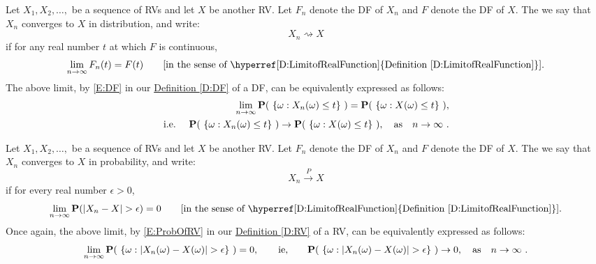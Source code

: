 \begin{definition}\label{D:ConvInDist}
Let $X_1,X_2,\ldots,$ be a sequence of RVs and let $X$ be another RV.  Let $F_n$ denote the DF of $X_n$ and $F$ denote the DF of $X$.  The we say that $X_n$ converges to $X$ in distribution, and write:
\[
X_n \rightsquigarrow X
\]
if for any real number $t$ at which $F$ is continuous,
\[
\lim_{n \rightarrow \infty} F_n(t) = F(t) \qquad \text{[in the sense of \hyperref[D:LimitofRealFunction]{Definition \ref*{D:LimitofRealFunction}}].}
\]
The above limit, by \eqref{E:DF} in our \hyperref[D:DF]{Definition \ref*{D:DF}} of a DF, can be equivalently expressed as follows: 
\begin{eqnarray}
& & \lim_{n \rightarrow \infty} \mathbf{P}( \ \{\omega: X_n(\omega) \leq  t \} \ )= 
\mathbf{P}( \ \{\omega: X(\omega) \leq  t \} \ ), \notag \\
&\text{i.e.~} & \mathbf{P}( \ \{\omega: X_n(\omega) \leq t \} \ ) \rightarrow \mathbf{P}( \ \{\omega: X(\omega) \leq  t \} \ ), \quad \text{as} \quad n \rightarrow \infty \notag \ .
\end{eqnarray}
\end{definition}

\begin{definition}\label{D:ConvInProb}
Let $X_1,X_2,\ldots,$ be a sequence of RVs and let $X$ be another RV.  Let $F_n$ denote the DF of $X_n$ and $F$ denote the DF of $X$.  The we say that $X_n$ converges to $X$ in probability, and write:
\[
X_n \overset{P}{\longrightarrow} X
\]
if for every real number $\epsilon > 0$,
\[
\lim_{n \rightarrow \infty} \p(|X_n-X|> \epsilon) = 0 \qquad \text{[in the sense of \hyperref[D:LimitofRealFunction]{Definition \ref*{D:LimitofRealFunction}}].}
\]
Once again, the above limit, by \eqref{E:ProbOfRV} in our \hyperref[D:RV]{Definition \ref*{D:RV}} of a RV, can be equivalently expressed as follows: 
\[
\lim_{n \rightarrow \infty} \mathbf{P}( \ \{\omega: |X_n(\omega) - X(\omega)| > \epsilon\} \ )=0, \qquad \text{ie,} \qquad \mathbf{P}( \ \{\omega: |X_n(\omega) - X(\omega)| > \epsilon\} \ ) \rightarrow 0, \quad \text{as} \quad n \rightarrow \infty \ .
\]
\end{definition}

